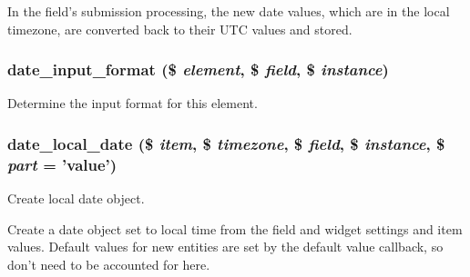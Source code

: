 \begin{DoxyItemize}
\item In the field's submission processing, the new date values, which are in the local timezone, are converted back to their UTC values and stored. 
\end{DoxyItemize}\hypertarget{date__elements_8inc_a3767feebcc2853dda728fffca027b312}{
\subsubsection[{date\_\-input\_\-format}]{\setlength{\rightskip}{0pt plus 5cm}date\_\-input\_\-format (\$ {\em element}, \/  \$ {\em field}, \/  \$ {\em instance})}}
\label{date__elements_8inc_a3767feebcc2853dda728fffca027b312}
Determine the input format for this element. \hypertarget{date__elements_8inc_aafe3fa0de290a2166dc60e7a44a7cb53}{
\subsubsection[{date\_\-local\_\-date}]{\setlength{\rightskip}{0pt plus 5cm}date\_\-local\_\-date (\$ {\em item}, \/  \$ {\em timezone}, \/  \$ {\em field}, \/  \$ {\em instance}, \/  \$ {\em part} = {\ttfamily 'value'})}}
\label{date__elements_8inc_aafe3fa0de290a2166dc60e7a44a7cb53}
Create local date object.

Create a date object set to local time from the field and widget settings and item values. Default values for new entities are set by the default value callback, so don't need to be accounted for here. 